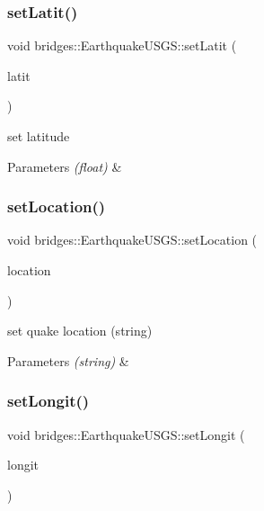 \subsubsection{\texorpdfstring{set\+Latit()}{setLatit()}}
{\footnotesize\ttfamily void bridges\+::\+Earthquake\+U\+S\+G\+S\+::set\+Latit (\begin{DoxyParamCaption}\item[{float}]{latit }\end{DoxyParamCaption})\hspace{0.3cm}{\ttfamily [inline]}}

set latitude


\begin{DoxyParams}{Parameters}
{\em (float)} & \\
\hline
\end{DoxyParams}
\mbox{\label{classbridges_1_1_earthquake_u_s_g_s_a5dc533759cc900440d70bdfc68f16599}} 
\subsubsection{\texorpdfstring{set\+Location()}{setLocation()}}
{\footnotesize\ttfamily void bridges\+::\+Earthquake\+U\+S\+G\+S\+::set\+Location (\begin{DoxyParamCaption}\item[{string}]{location }\end{DoxyParamCaption})\hspace{0.3cm}{\ttfamily [inline]}}

set quake location (string)


\begin{DoxyParams}{Parameters}
{\em (string)} & \\
\hline
\end{DoxyParams}
\mbox{\label{classbridges_1_1_earthquake_u_s_g_s_a745dc27f3c68a3ae996ceb7771d89ec5}} 
\subsubsection{\texorpdfstring{set\+Longit()}{setLongit()}}
{\footnotesize\ttfamily void bridges\+::\+Earthquake\+U\+S\+G\+S\+::set\+Longit (\begin{DoxyParamCaption}\item[{float}]{longit }\end{DoxyParamCaption})\hspace{0.3cm}{\ttfamily [inline]}}

